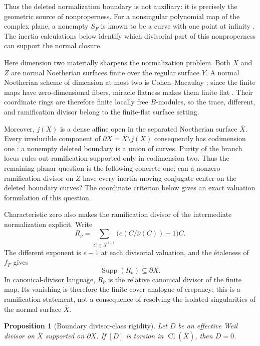 \documentclass[11pt]{article}
\newtheorem{proposition}[theorem]{Proposition}
\theoremstyle{remark}
\theoremstyle{definition}
\begin{document}
Thus the deleted normalization boundary is not auxiliary: it is precisely
the geometric source of nonproperness.  For a nonsingular polynomial map of
the complex plane, a nonempty \(S_F\) is known to be a curve with one point
at infinity \cite{ChauNonproperValueSet}.  The inertia calculations below
identify which divisorial part of this nonproperness can support the normal
closure.

Here dimension two materially sharpens the normalization problem.  Both
\(\overline X\) and \(Z\) are normal Noetherian surfaces finite over the
regular surface \(Y\).  A normal Noetherian scheme of dimension at most two
is Cohen--Macaulay \cite{StacksNormalSurfaceCM}; since the finite maps have
zero-dimensional fibers, miracle flatness makes them finite flat
\cite{StacksMiracleFlatness}.  Their coordinate rings are therefore finite
locally free \(B\)-modules, so the trace, different, and ramification divisor
belong to the finite-flat surface setting.

Moreover, \(j(X)\) is a dense affine open in the separated Noetherian surface
\(\overline X\).  Every irreducible component of
\(\partial X=\overline X\setminus j(X)\) consequently has codimension one
\cite{StacksAffineComplement}: a nonempty deleted boundary is a union of
curves.  Purity of the branch locus rules out ramification supported only in
codimension two.  Thus the remaining planar question is the following
concrete one: can a nonzero ramification divisor on \(Z\) have every
inertia-moving conjugate center on the deleted boundary curves?  The
coordinate criterion below gives an exact valuation formulation of this
question.

Characteristic zero also makes the ramification divisor of the intermediate
normalization explicit.  Write
\[
  R_{\bar\nu}
  =
  \sum_{C\in\overline X^{(1)}}
    \bigl(e(C/\bar\nu(C))-1\bigr)C.
\]
The different exponent is \(e-1\) at each divisorial valuation, and the
\'etaleness of \(f_F\) gives
\[
  \operatorname{Supp}(R_{\bar\nu})\subseteq\partial X.
\]
In canonical-divisor language, \(R_{\bar\nu}\) is the relative canonical
divisor of the finite map.  Its vanishing is therefore the finite-cover
analogue of crepancy; this is a ramification statement, not a consequence
of resolving the isolated singularities of the normal surface
\(\overline X\).

\begin{proposition}[Boundary divisor-class rigidity]
\label{prop:boundary-divisor-class-rigidity}
Let \(D\) be an effective Weil divisor on \(\overline X\) supported on
\(\partial X\).  If \([D]\) is torsion in
\(\operatorname{Cl}(\overline X)\), then \(D=0\).
\end{proposition}
\end{document}
